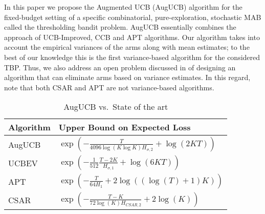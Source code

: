 In this paper we propose the Augmented UCB (AugUCB) algorithm for the fixed-budget setting of a specific combinatorial, pure-exploration, stochastic MAB called the thresholding bandit problem.
 AugUCB essentially combines the approach of UCB-Improved, CCB \citep{liu2016modification} and APT algorithms. Our algorithm takes into account the empirical variances of the arms along with mean estimates; to the best of our knowledge this is the first variance-based algorithm for the considered TBP. 
Thus, we also address an open problem discussed in \cite{auer2010ucb} of designing an algorithm that can eliminate arms based on variance estimates. In this regard, note that both CSAR and APT are not variance-based algorithms. 

\begin{table}[b]
\caption{AugUCB vs.\ State of the art}
\label{tab:regret-bds}
\begin{center}
\begin{tabular}{|p{1.3cm}|p{6.4cm}|}
\hline
Algorithm  & Upper Bound on Expected Loss \\
\hline
\hline
AugUCB      &$ \exp\left(- \frac{T}{4096 \log(K\log K)H_{\sigma,2}} + \log\left(2KT\right) \right) $ \\
\hline
\hline
UCBEV		&$\exp\left(-\frac{1}{512}\frac{T-2K}{H_{\sigma,1}} + \log\left(6KT\right)\right)$ \\
\hline
\hline
APT         &$\exp\left(-\frac{T}{64 H_1}+2\log((\log(T)+1)K)\right)$ \\
\hline
\hline
CSAR		&$\exp\left(-\frac{T-K}{72\log(K)H_{CSAR,2}}+2\log(K)\right)$ \\
\hline

\end{tabular}
\end{center}
\end{table}

